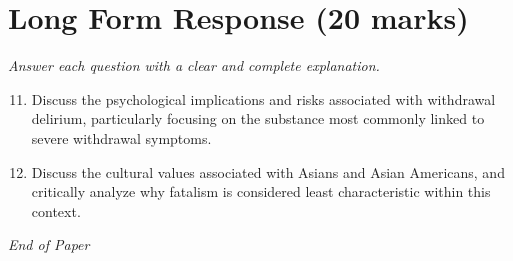 \documentclass[12pt]{article}
\begin{document}
\section*{Long Form Response (20 marks)}
\textit{Answer each question with a clear and complete explanation.}
\begin{enumerate}[label=\arabic*.]
\setcounter{enumi}{10}
\item Discuss the psychological implications and risks associated with withdrawal delirium, particularly focusing on the substance most commonly linked to severe withdrawal symptoms.
\item Discuss the cultural values associated with Asians and Asian Americans, and critically analyze why fatalism is considered least characteristic within this context.
\end{enumerate}

\vfill
\noindent\textit{End of Paper}
\end{document}
